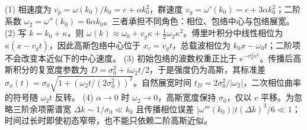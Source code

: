 (1) 相速度为 \(v_p=\omega(k_0)/k_0=c+\alpha k_0^2\)，群速度 \(v_g=\omega'(k_0)=c+3\alpha k_0^2\)；二阶系数 \(\omega_2=\omega''(k_0)=6\alpha k_0\)。三者承担不同角色：相位、包络中心与包络展宽。
(2) 写 \(k=k_0+\kappa\)，则 \(\omega(k)\approx\omega_0+v_g\kappa+\frac12\omega_2\kappa^2\)。傅里叶积分中线性相位为 \(\kappa(x-v_gt)\)，因此高斯包络中心位于 \(x_c=v_gt\)，总载波相位为 \(k_0x-\omega_0t\)；二阶项不会改变本近似下的中心速度。
(3) 初始包络的波数权重正比于 \(e^{-\sigma_0^2\kappa^2}\)。传播后高斯积分的复宽度参数为 \(D=\sigma_0^2+i\omega_2t/2\)，于是强度仍为高斯，其标准差 \(\sigma_x(t)=\sigma_0\sqrt{1+(\omega_2t/(2\sigma_0^2))^2}\)。自然展宽时间 \(t_D=2\sigma_0^2/|\omega_2|\)，二次相位曲率的符号随 \(\omega_2t\) 反转。
(4) \(\alpha\to0\) 时 \(\omega_2\to0\)，高斯宽度保持 \(\sigma_0\)，仅以 \(c\) 平移。为忽略三阶余项需谱宽 \(\Delta k\sim1/\sigma_0\ll k_0\) 且传播相位误差 \(|\omega'''(k_0)|t(\Delta k)^3/6\ll1\)；时间过长时即使初态窄带，也不能只依赖二阶高斯近似。
